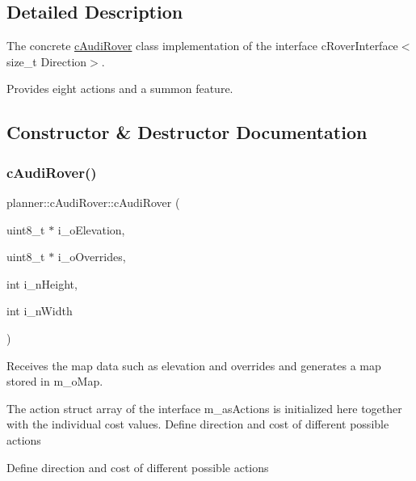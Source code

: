 \subsection{Detailed Description}
The concrete \mbox{\hyperlink{classplanner_1_1c_audi_rover}{c\+Audi\+Rover}} class implementation of the interface c\+Rover\+Interface$<$size\+\_\+t Direction$>$. 

Provides eight actions and a summon feature. 

\subsection{Constructor \& Destructor Documentation}
\mbox{\label{classplanner_1_1c_audi_rover_abafb926aca93fb8382284a10bd341986}} 
\subsubsection{\texorpdfstring{c\+Audi\+Rover()}{cAudiRover()}\hspace{0.1cm}{\footnotesize\ttfamily [1/2]}}
{\footnotesize\ttfamily planner\+::c\+Audi\+Rover\+::c\+Audi\+Rover (\begin{DoxyParamCaption}\item[{uint8\+\_\+t $\ast$}]{i\+\_\+o\+Elevation,  }\item[{uint8\+\_\+t $\ast$}]{i\+\_\+o\+Overrides,  }\item[{int}]{i\+\_\+n\+Height,  }\item[{int}]{i\+\_\+n\+Width }\end{DoxyParamCaption})}



Receives the map data such as elevation and overrides and generates a map stored in m\+\_\+o\+Map. 

The action struct array of the interface m\+\_\+as\+Actions is initialized here together with the individual cost values. Define direction and cost of different possible actions

Define direction and cost of different possible actions \mbox{\label{classplanner_1_1c_audi_rover_abafb926aca93fb8382284a10bd341986}} 

